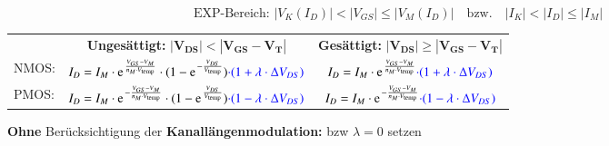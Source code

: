 $$ \boxed{ \text{EXP-Bereich: } |V_K(I_D)| < |V_{GS}| \leq |V_M(I_D)| \quad \text{bzw.} \quad |I_K| < |I_D| \leq |I_M| } $$  %


\resizebox{\columnwidth}{!}
{
    \renewcommand{\arraystretch}{1.5}
    \begin{tabular}{@{}l c | c@{}}
                & \textbf{Ungesättigt:} \quad $\bm{| V_{DS} | < | V_{GS} - V_T |}$                                                                                                  & \textbf{Gesättigt:} \quad $\bm{| V_{DS} | \geq | V_{GS} - V_T |}$                                                     \\
        NMOS:   & $I_D = I_M \cdot \e^{\frac{V_{GS} - V_M}{n_M \cdot V_\text{temp}}} \cdot (1 - \e^{-\frac{V_{DS}}{V_\text{temp}}}) \cbl{\cdot (1 + \lambda \cdot \Delta V_{DS})}$  & $I_D = I_M \cdot \e^{\frac{V_{GS} - V_M}{n_M \cdot V_\text{temp}}} \cbl{\cdot (1 + \lambda \cdot \Delta V_{DS})}$     \\
        \midrule
        PMOS:   & $I_D = I_M \cdot \e^{- \frac{V_{GS} - V_M}{n_M \cdot V_\text{temp}}} \cdot (1 - \e^{\frac{V_{DS}}{V_\text{temp}}}) \cbl{\cdot (1 - \lambda \cdot \Delta V_{DS})}$ & $I_D = I_M \cdot \e^{- \frac{V_{GS} - V_M}{n_M \cdot V_\text{temp}}} \cbl{\cdot (1 - \lambda \cdot \Delta V_{DS})}$   \\
    \end{tabular}
    \renewcommand{\arraystretch}{1}
}

\medskip

\textbf{Ohne} Berücksichtigung der \textbf{Kanallängenmodulation:}  bzw $\lambda = 0$ setzen






